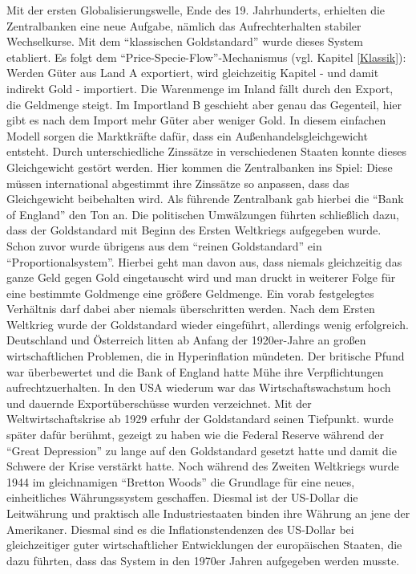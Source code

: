 Mit der ersten Globalisierungswelle, Ende des 19. Jahrhunderts, erhielten die Zentralbanken eine neue Aufgabe, nämlich das Aufrechterhalten stabiler Wechselkurse. Mit dem "`klassischen Goldstandard"' wurde dieses System etabliert. Es folgt dem "`Price-Specie-Flow"'-Mechanismus (vgl. Kapitel \ref{Klassik}): Werden Güter aus Land A exportiert, wird gleichzeitig Kapitel - und damit indirekt Gold - importiert. Die Warenmenge im Inland fällt durch den Export, die Geldmenge steigt. Im Importland B geschieht aber genau das Gegenteil, hier gibt es nach dem Import mehr Güter aber weniger Gold. In diesem einfachen Modell sorgen die Marktkräfte dafür, dass ein Außenhandelsgleichgewicht entsteht. Durch unterschiedliche Zinssätze in verschiedenen Staaten konnte dieses Gleichgewicht gestört werden. Hier kommen die Zentralbanken ins Spiel: Diese müssen international abgestimmt ihre Zinssätze so anpassen, dass das Gleichgewicht beibehalten wird. Als führende Zentralbank gab hierbei die "`Bank of England"' den Ton an. Die politischen Umwälzungen führten schließlich dazu, dass der Goldstandard mit Beginn des Ersten Weltkriegs aufgegeben wurde. Schon zuvor wurde übrigens aus dem "`reinen Goldstandard"' ein "`Proportionalsystem"'. Hierbei geht man davon aus, dass niemals gleichzeitig das ganze Geld gegen Gold eingetauscht wird und man druckt in weiterer Folge für eine bestimmte Goldmenge eine größere Geldmenge. Ein vorab festgelegtes Verhältnis darf dabei aber niemals überschritten werden. Nach dem Ersten Weltkrieg wurde der Goldstandard wieder eingeführt, allerdings wenig erfolgreich. Deutschland und Österreich litten ab Anfang der 1920er-Jahre an großen wirtschaftlichen Problemen, die in Hyperinflation mündeten. Der britische Pfund war überbewertet und die Bank of England hatte Mühe ihre Verpflichtungen aufrechtzuerhalten. In den USA wiederum war das Wirtschaftswachstum hoch und dauernde Exportüberschüsse wurden verzeichnet. Mit der Weltwirtschaftskrise ab 1929 erfuhr der Goldstandard seinen Tiefpunkt. \textcite{Friedman1963} wurde später dafür berühmt, gezeigt zu haben wie die Federal Reserve während der "`Great Depression"' zu lange auf den Goldstandard gesetzt hatte und damit die Schwere der Krise verstärkt hatte. Noch während des Zweiten Weltkriegs wurde 1944 im gleichnamigen "`Bretton Woods"' die Grundlage für eine neues, einheitliches Währungssystem geschaffen. Diesmal ist der US-Dollar die Leitwährung und praktisch alle Industriestaaten binden ihre Währung an jene der Amerikaner. Diesmal sind es die Inflationstendenzen des US-Dollar bei gleichzeitiger guter wirtschaftlicher Entwicklungen der europäischen Staaten, die dazu führten, dass das System in den 1970er Jahren aufgegeben werden musste.

